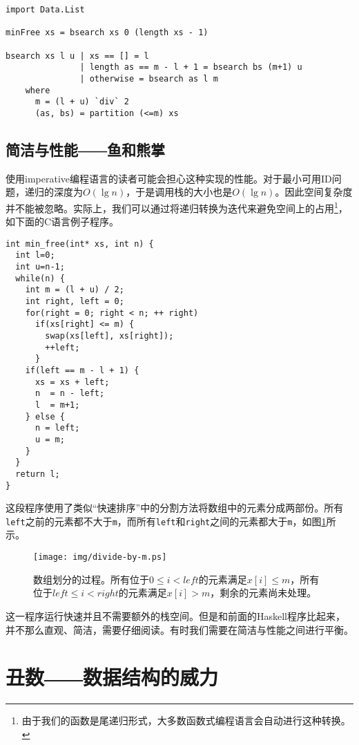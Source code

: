 \documentclass[UTF8]{article}
\begin{document}
\lstset{language=Haskell}
\begin{lstlisting}
import Data.List

minFree xs = bsearch xs 0 (length xs - 1)

bsearch xs l u | xs == [] = l
               | length as == m - l + 1 = bsearch bs (m+1) u
               | otherwise = bsearch as l m
    where
      m = (l + u) `div` 2
      (as, bs) = partition (<=m) xs
\end{lstlisting}

\subsection{简洁与性能――鱼和熊掌}
使用imperative编程语言的读者可能会担心这种实现的性能。对于最小可用ID问题，递归的深度为$O(\lg n)$，于是调用栈的大小也是$O(\lg n)$。因此空间复杂度并不能被忽略。实际上，我们可以通过将递归转换为迭代来避免空间上的占用\footnote{由于我们的函数是尾递归形式，大多数函数式编程语言会自动进行这种转换。}，如下面的C语言例子程序。

\lstset{language=C}
\begin{lstlisting}
int min_free(int* xs, int n) {
  int l=0;
  int u=n-1;
  while(n) {
    int m = (l + u) / 2;
    int right, left = 0;
    for(right = 0; right < n; ++ right)
      if(xs[right] <= m) {
        swap(xs[left], xs[right]);
        ++left;
      }
    if(left == m - l + 1) {
      xs = xs + left;
      n  = n - left;
      l  = m+1;
    } else {
      n = left;
      u = m;
    }
  }
  return l;
}
\end{lstlisting}

这段程序使用了类似“快速排序”中的分割方法将数组中的元素分成两部份。所有\texttt{left}之前的元素都不大于\texttt{m}，而所有\texttt{left}和\texttt{right}之间的元素都大于\texttt{m}，如图\ref{fig:divide}所示。

\begin{figure}[htbp]
  \centering
  \texttt{[image: img/divide-by-m.ps]}
  \caption{数组划分的过程。所有位于$0 \leq i < left$的元素满足$x[i] \leq m$，所有位于$left \leq i < right$的元素满足$x[i] > m$，剩余的元素尚未处理。} \label{fig:divide}
\end{figure}

这一程序运行快速并且不需要额外的栈空间。但是和前面的Haskell程序比起来，并不那么直观、简洁，需要仔细阅读。有时我们需要在简洁与性能之间进行平衡。

\section{丑数――数据结构的威力}
\end{document}
